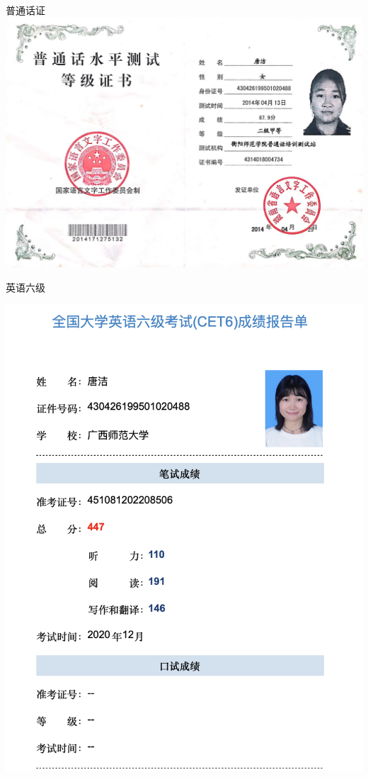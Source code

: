 \documentclass[UFT8]{ctexart}%
\begin{document}
\begin{center}
普通话证
\includegraphics[scale=0.26]{figs/普通话证.JPG }

英语六级

\includegraphics[scale=0.3]{figs/英语六级.JPG }
\end{center}
\end{document}
